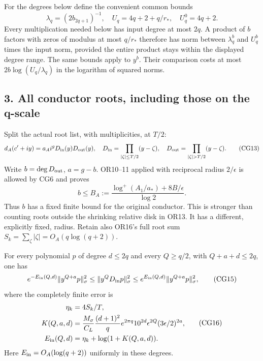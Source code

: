 \documentclass[11pt]{article}
\begin{document}
For the degrees below define the convenient common bounds \[
\lambda_q=(2b_{2q+1})^{-1},\quad
U_q=4q+2+q/r_*,\quad U_q^0=4q+2.
\tag{CG12}
\] Every multiplication needed below has input degree at most \(2q\). A product of \(b\) factors with zeros of modulus at most \(q/r_*\) therefore has norm between \(\lambda_q^b\) and \(U_q^b\) times the input norm, provided the entire product stays within the displayed degree range. The same bounds apply to \(y^b\). Their comparison costs at most \(2b\log(U_q/\lambda_q)\) in the logarithm of squared norms.

\subsection{3. All conductor roots, including those on the q-scale}\label{all-conductor-roots-including-those-on-the-q-scale}

Split the actual root list, with multiplicities, at \(T/2\): \[
d_A(c'+iy)=a_Ai^g D_{\rm in}(y)D_{\rm out}(y),
\quad D_{\rm in}=\prod_{|\zeta|\le T/2}(y-\zeta),
\quad D_{\rm out}=\prod_{|\zeta|>T/2}(y-\zeta).
\tag{CG13}
\] Write \(b=\deg D_{\rm out}\), \(a=g-b\). OR10--11 applied with reciprocal radius \(2/\epsilon\) is allowed by CG6 and proves \[
b\le B_A:=\frac{\log^+(A_1/a_*)+8B/\epsilon}{\log2}.
\tag{CG14}
\] Thus \(b\) has a fixed finite bound for the original conductor. This is stronger than counting roots outside the shrinking relative disk in OR13. It has a different, explicitly fixed, radius. Retain also OR16's full root sum \(S_k=\sum_\zeta|\zeta|=O_A(q\log(q+2))\).

For every polynomial \(p\) of degree \(d\le2q\) and every \(Q\ge q/2\), with \(Q+a+d\le2q\), one has \[
e^{-E_{\rm in}(Q,d)}\|y^{Q+a}p\|_\sigma^2
\le\|y^QD_{\rm in}p\|_\sigma^2
\le e^{E_{\rm in}(Q,d)}\|y^{Q+a}p\|_\sigma^2,
\tag{CG15}
\] where the completely finite error is \[
\begin{split}
\eta_k&=4S_k/T,\\
K(Q,a,d)&=\frac{M_\sigma}{C_L}\frac{(d+1)^2}{q}
 e^{2\pi q}10^{2d}\epsilon^{2Q}(3\epsilon/2)^{2a},\\
E_{\rm in}(Q,d)&=\eta_k+\log(1+K(Q,a,d)).
\end{split}\tag{CG16}
\] Here \(E_{\rm in}=O_A(\log(q+2))\) uniformly in these degrees.
\end{document}
